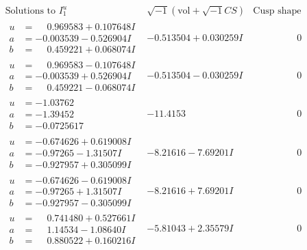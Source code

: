 \documentclass[1p]{elsarticle_modified}
\theoremstyle{definition}
\newcommand{\I}{\sqrt{-1}}
\begin{document}
$$\begin{array}{c|c|c}  
\text{Solutions to }I^u_{1}& \I (\text{vol} + \sqrt{-1}CS) & \text{Cusp shape}\\
 \hline 
\begin{aligned}
u &= \phantom{-}0.969583 + 0.107648 I \\
a &= -0.003539 - 0.526904 I \\
b &= \phantom{-}0.459221 + 0.068074 I\end{aligned}
 & -0.513504 + 0.030259 I & \phantom{-0.000000 } 0 \\ \hline\begin{aligned}
u &= \phantom{-}0.969583 - 0.107648 I \\
a &= -0.003539 + 0.526904 I \\
b &= \phantom{-}0.459221 - 0.068074 I\end{aligned}
 & -0.513504 - 0.030259 I & \phantom{-0.000000 } 0 \\ \hline\begin{aligned}
u &= -1.03762\phantom{ +0.000000I} \\
a &= -1.39452\phantom{ +0.000000I} \\
b &= -0.0725617\phantom{ +0.000000I}\end{aligned}
 & -11.4153\phantom{ +0.000000I} & \phantom{-0.000000 } 0 \\ \hline\begin{aligned}
u &= -0.674626 + 0.619008 I \\
a &= -0.97265 - 1.31507 I \\
b &= -0.927957 + 0.305099 I\end{aligned}
 & -8.21616 - 7.69201 I & \phantom{-0.000000 } 0 \\ \hline\begin{aligned}
u &= -0.674626 - 0.619008 I \\
a &= -0.97265 + 1.31507 I \\
b &= -0.927957 - 0.305099 I\end{aligned}
 & -8.21616 + 7.69201 I & \phantom{-0.000000 } 0 \\ \hline\begin{aligned}
u &= \phantom{-}0.741480 + 0.527661 I \\
a &= \phantom{-}1.14534 - 1.08640 I \\
b &= \phantom{-}0.880522 + 0.160216 I\end{aligned}
 & -5.81043 + 2.35579 I & \phantom{-0.000000 } 0 \\ \hline\begin{aligned}

\end{aligned}
\end{array}$$
\end{document}
